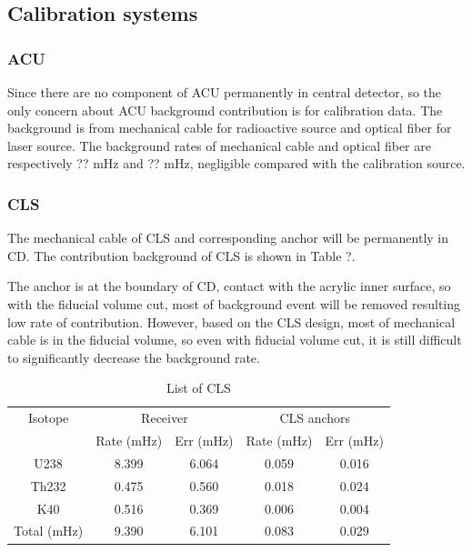 \documentclass[review,number,sort&compress]{elsarticle}
\begin{document}
\subsection{Calibration systems}

\subsubsection{ACU}

Since there are no component of ACU permanently in central detector, so the only concern about ACU background contribution is for calibration data.
The background is from mechanical cable for radioactive source and optical fiber for laser source.
The background rates of mechanical cable and optical fiber are respectively ?? mHz and ?? mHz, negligible compared with the calibration source. 

\subsubsection{CLS}

The mechanical cable of CLS and corresponding anchor will be permanently in CD. 
The contribution background of CLS is shown in Table ?.

The anchor is at the boundary of CD, contact with the acrylic inner surface, so with the fiducial volume cut, most of background event will be removed resulting low rate of contribution. 
However, based on the CLS design, most of mechanical cable is in the fiducial volume, so even with fiducial volume cut, it is still difficult to significantly decrease the background rate.

\begin{table}[h]
	\centering
	\caption{List of CLS}
	\renewcommand\tabcolsep{2mm} 
	\begin{tabular*}{110mm}{c|cc|cc}
		\hline
		Isotope	&\multicolumn{2}{c|}{Receiver}	&\multicolumn{2}{c}{CLS anchors}\\
				& 	Rate (mHz)	&	Err (mHz)	& 	Rate (mHz)	&	Err (mHz)\\
		\hline
		U238 	&  	8.399 		&	6.064	 	&	0.059  		&	0.016	 \\
		Th232	&	0.475		&	0.560	 	&	0.018		&	0.024	 \\
		K40		& 	0.516		&	0.369	 	&	0.006 		&	0.004	 \\
	Total (mHz)	&	9.390		&	6.101	 	&	0.083		&	0.029	 \\
		\hline
	\end{tabular*}
\end{table}
\end{document}
